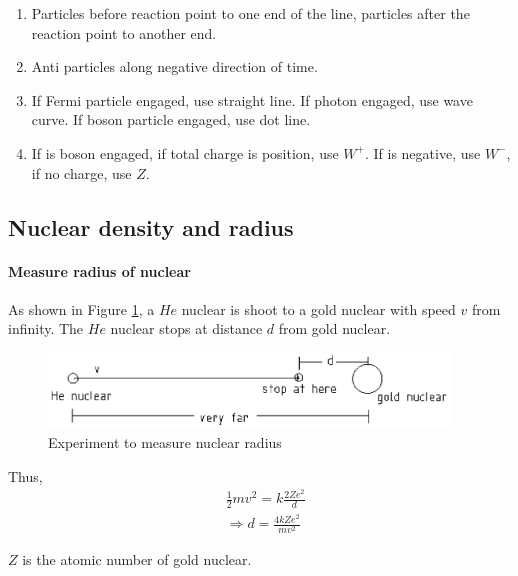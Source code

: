         \begin{enumerate}
            \item Particles before reaction point to one end of the line, particles after the reaction point to another end.
            \item Anti particles along negative direction of time.
            \item If Fermi particle engaged, use straight line. If photon engaged, use wave curve. If boson particle engaged, use dot line.
            \item If is boson engaged, if total charge is position, use $W^+$. If is negative, use $W^-$, if no charge, use $Z$.
        \end{enumerate}

    \subsection{Nuclear density and radius}
        \paragraph{Measure radius of nuclear}
            As shown in Figure \ref{nuc_rad_exp}, a $He$ nuclear is shoot to a gold nuclear with speed $v$ from infinity. The $He$ nuclear stops at distance $d$ from gold nuclear.

            \begin{figure}[H]
                \begin{center}
                    \includegraphics[height=2cm]{nuclear_charts/nuc_rad_exp.eps}
                \end{center}
                \caption{Experiment to measure nuclear radius}
                \label{nuc_rad_exp}
            \end{figure}

            Thus, 
            \begin{align}
                & \frac{1}{2} m v^2 = k \frac{2 Z e^2}{d} \\
                & \Rightarrow d = \frac{4 k Z e^2}{m v^2}
            \end{align}

            $Z$ is the atomic number of gold nuclear.

